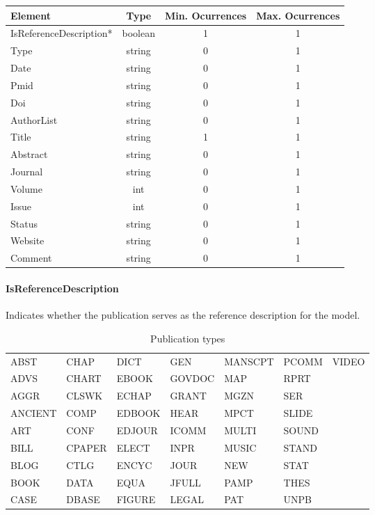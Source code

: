 \documentclass[a4paper]{report}
\begin{document}
\begin{tabular}{|l|c|c|c|}
    \hline
    \textbf{Element} & \textbf{Type} & \textbf{Min. Ocurrences} & \textbf{Max. Ocurrences} \\
    \hline
    IsReferenceDescription* & boolean & 1 & 1 \\
    Type & string & 0 & 1 \\
    Date & string & 0 & 1 \\
    Pmid & string & 0 & 1 \\
    Doi & string & 0 & 1 \\
    AuthorList & string & 0 & 1\\
    Title & string & 1 & 1\\
    Abstract & string & 0 & 1 \\
    Journal & string & 0 & 1\\
    Volume & int & 0 & 1 \\
    Issue & int & 0 & 1 \\
    Status & string & 0 & 1 \\
    Website & string & 0 & 1 \\
    Comment & string & 0 & 1 \\
    \hline
\end{tabular}

\paragraph{IsReferenceDescription}
Indicates whether the publication serves as the reference description for the model.

\begin{table}
    \centering
    \begin{tabular}{l l l l l l l}    
        \hline
        ABST & CHAP & DICT & GEN & MANSCPT & PCOMM & VIDEO \\
        ADVS & CHART & EBOOK & GOVDOC & MAP & RPRT & \\
        AGGR & CLSWK & ECHAP & GRANT & MGZN & SER & \\
        ANCIENT & COMP & EDBOOK & HEAR & MPCT & SLIDE & \\
        ART & CONF & EDJOUR & ICOMM & MULTI & SOUND & \\
        BILL & CPAPER & ELECT & INPR & MUSIC & STAND & \\
        BLOG & CTLG & ENCYC & JOUR & NEW & STAT & \\
        BOOK & DATA & EQUA & JFULL & PAMP & THES & \\
        CASE & DBASE & FIGURE & LEGAL & PAT & UNPB & \\
        \hline
    \end{tabular}
    \caption{Publication types}
    \label{table:publicationtypes}
\end{table}
\end{document}

